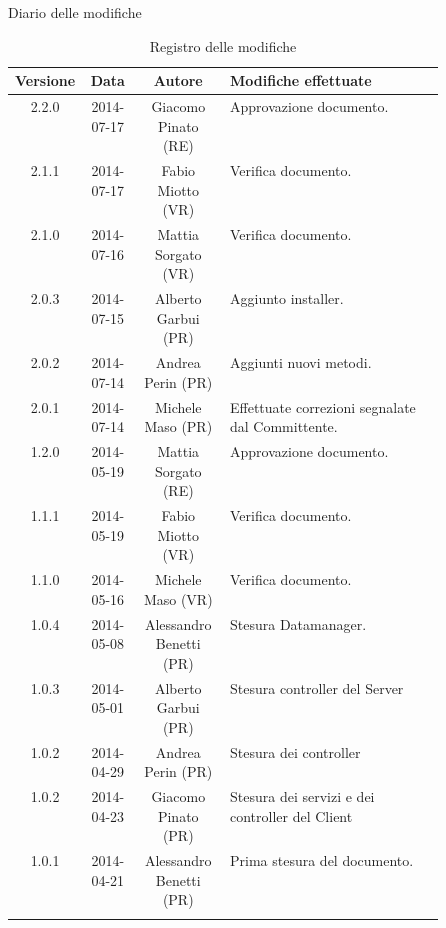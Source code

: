 
\newpage
Diario delle modifiche
\begin{center}
\begin{longtable}{|c|c|c|p{0.5\linewidth}|}
\toprule
\textbf{Versione} & \textbf{Data} & \textbf{Autore} & \textbf{Modifiche effettuate}\\


\midrule
2.2.0 & 2014-07-17 & Giacomo Pinato  (RE) & Approvazione documento.\\

\midrule
2.1.1 & 2014-07-17 & Fabio Miotto  (VR) & Verifica documento.\\

\midrule
2.1.0 & 2014-07-16 & Mattia Sorgato  (VR) & Verifica documento.\\

\midrule
2.0.3 & 2014-07-15 & Alberto Garbui (PR) & Aggiunto installer.\\

\midrule
2.0.2 & 2014-07-14 & Andrea Perin (PR) & Aggiunti nuovi metodi.\\

\midrule
2.0.1 & 2014-07-14 & Michele Maso (PR) & Effettuate correzioni segnalate dal Committente.\\

\midrule
1.2.0 & 2014-05-19 & Mattia Sorgato (RE) & Approvazione documento.\\
\midrule
1.1.1 & 2014-05-19 & Fabio Miotto (VR) & Verifica documento.\\
\midrule
1.1.0 & 2014-05-16 & Michele Maso (VR) & Verifica documento.\\
\midrule

1.0.4 & 2014-05-08 & Alessandro Benetti (PR) & Stesura Datamanager.\\
\midrule
1.0.3 & 2014-05-01 & Alberto Garbui (PR) & Stesura controller del Server\\
\midrule
1.0.2 & 2014-04-29 & Andrea Perin (PR) & Stesura dei controller\\
\midrule
1.0.2 & 2014-04-23 & Giacomo Pinato (PR) & Stesura dei servizi e dei controller del Client\\
\midrule
1.0.1 & 2014-04-21 & Alessandro Benetti (PR) & Prima stesura del documento.\\

\bottomrule
\caption{Registro delle modifiche}
\label{tab:changelog}

\end{longtable}
\end{center}

